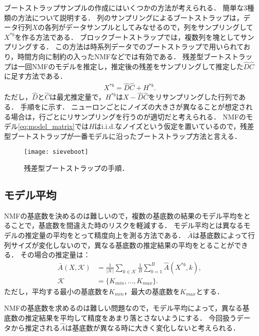 ブートストラップサンプルの作成にはいくつかの方法が考えられる．
簡単な3種類の方法について説明する．
列のサンプリングによるブートストラップは，データ行列$X$の各列がデータサンプルとしてみなせるので，列をサンプリングして$X^{*b}$を作る方法である．
ブロックブートストラップでは，複数列を塊としてサンプリングする．
この方法は時系列データでのブートストラップで用いられており，時間方向に制約の入ったNMFなどでは有効である．
残差型ブートストラップは一回NMFのモデルを推定し，推定後の残差をサンプリングして推定した$\hat{D}\hat{C}$に足す方法である．
\begin{align}
	X^{*b} = \hat{D} \hat{C} + H^{*b}.
\end{align}
ただし，$\hat{D}$と$\hat{C}$は最尤推定量で，$H^{*b}$は$X - \hat{D}\hat{C}$をリサンプリングした行列である．
手順をに示す．
ニューロンごとにノイズの大きさが異なることが想定される場合は，行ごとにリサンプリングを行うのが適切だと考えられる．
NMFのモデル\eqref{eq:model_matrix}では$H$はi.i.d.なノイズという仮定を置いているので，残差型ブートストラップが一番モデルに沿ったブートストラップ方法と言える．
\begin{figure}[htbp]
	\centering
	\texttt{[image: sieveboot]}
	\caption{残差型ブートストラップの手順．}
	\label{fig:sieveboot}
\end{figure}

\subsection{モデル平均}
NMFの基底数を決めるのは難しいので，複数の基底数の結果のモデル平均をとることで，基底数を間違えた時のリスクを軽減する．
モデル平均とは異なるモデルの推定量の平均をとって精度向上を測る方法である．
$\bar{A}$は基底数によって行列サイズが変化しないので，異なる基底数の推定結果の平均をとることができる．
その場合の推定量は：
\begin{align}
	\bar{A}(X,\mathcal{K}) &= \frac{1}{|\mathcal{K}|} \sum_{k \in \mathcal{K}} \frac{1}{B} \sum_{b=1}^B \hat{A}(X^{*b}, k),\\
	\mathcal{K} &= \{K_{min}, \dots, K_{max}\}.
\end{align}
ただし，平均する最小の基底数を$K_{min}$，最大の基底数を$K_{max}$とする．

NMFの基底数を求めるのは難しい問題なので，モデル平均によって，異なる基底数の推定結果を平均して精度をあまり落とさないようにする．
今回扱うデータから推定される$\hat{A}$は基底数が異なる時に大きく変化しないと考えられる．


